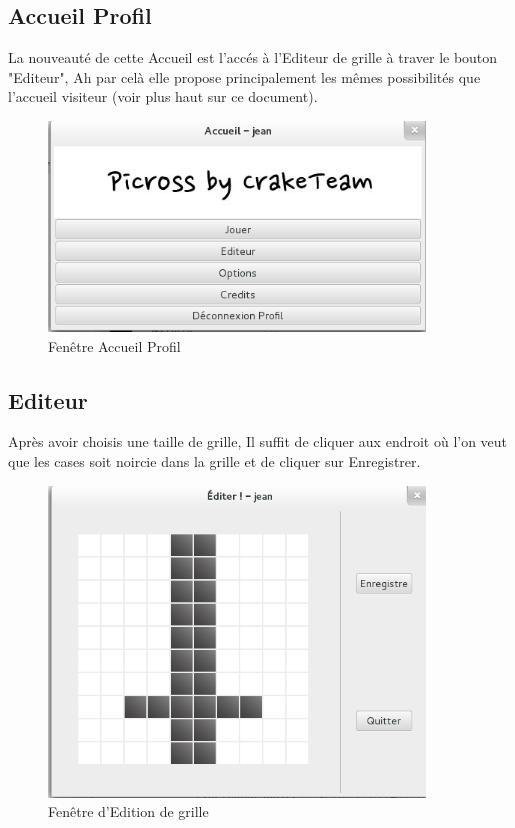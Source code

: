 \documentclass[11pt]{article}
\begin{document}
\newpage

\subsection{Accueil Profil}

La nouveauté de cette Accueil est l'accés à l'Editeur de grille à traver le bouton "Editeur", Ah par celà elle propose principalement les mêmes possibilités que l'accueil visiteur (voir plus haut sur ce document).

	\begin{figure}[!ht]
		\centering
		\includegraphics[width=10cm]{./Screenshot/AccueilProfil.png}
		\caption{Fenêtre Accueil Profil}
	\end{figure}

\newpage

\subsection{Editeur}

Après avoir choisis une taille de grille, Il suffit de cliquer aux endroit où l'on veut que les cases soit noircie dans la grille et de cliquer sur Enregistrer.

	\begin{figure}[!ht]
		\centering
		\includegraphics[width=10cm]{./Screenshot/Editeur.png}
		\caption{Fenêtre d'Edition de grille}
	\end{figure}
\end{document}
